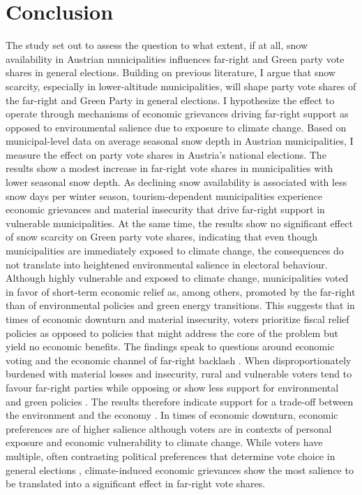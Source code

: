 \documentclass{article}
\begin{document}
\section{Conclusion}
The study set out to assess the question to what extent, if at all, snow availability in Austrian municipalities influences far-right and Green party vote shares in general elections. 
Building on previous literature, I argue that snow scarcity, especially in lower-altitude municipalities, will shape party vote shares of the far-right and Green Party in general elections. I hypothesize the effect to operate through mechanisms of economic grievances driving far-right support as opposed to environmental salience due to exposure to climate change. Based on municipal-level data on average seasonal snow depth in Austrian municipalities, I measure the effect on party vote shares in Austria's national elections. The results show a modest increase in far-right vote shares in municipalities with lower seasonal snow depth. As declining snow availability is associated with less snow days per winter season, tourism-dependent municipalities experience economic grievances and material insecurity that drive far-right support in vulnerable municipalities. At the same time, the results show no significant effect of snow scarcity on Green party vote shares, indicating that even though municipalities are immediately exposed to climate change, the consequences do not translate into heightened environmental salience in electoral behaviour. Although highly vulnerable and exposed  to climate change, municipalities voted in favor of short-term economic relief as, among others, promoted by the far-right than of environmental policies and green energy transitions. This suggests that in times of economic downturn and material insecurity, voters prioritize fiscal relief policies as opposed to policies that might address the core of the problem but yield no economic benefits. The findings speak to questions around economic voting and the economic channel of far-right backlash \parencite{Rho2017, LewisBeck2019, Habersack2024}. When disproportionately burdened with material losses and insecurity, rural and vulnerable voters tend to favour far-right parties while opposing or show less support for environmental and green policies \parencite{Halikiopoulou_Vrakopoulos_Arndt_2026}. The results therefore indicate support for a trade-off between the environment and the economy \parencite{Shum2012, Mildenberger2017}. In times of economic downturn, economic preferences are of higher salience although voters are in contexts of personal exposure and economic vulnerability to climate change. While voters have multiple, often contrasting political preferences that determine vote choice in general elections \parencite{Zaller1992}, climate-induced economic grievances show the most salience to be translated into a significant effect in far-right vote shares. 
\end{document}

